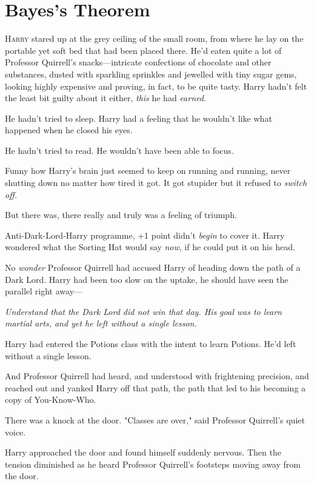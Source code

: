 \chapter{Bayes's Theorem}

\lettrine{H}{arry} stared up at the grey ceiling of the small room, from where he lay on the
portable yet soft bed that had been placed there. He'd eaten quite a lot of
Professor Quirrell's snacks---intricate confections of chocolate and other
substances, dusted with sparkling sprinkles and jewelled with tiny sugar gems,
looking highly expensive and proving, in fact, to be quite tasty. Harry hadn't
felt the least bit guilty about it either, \emph{this} he had \emph{earned}.

He hadn't tried to sleep. Harry had a feeling that he wouldn't like what
happened when he closed his eyes.

He hadn't tried to read. He wouldn't have been able to focus.

Funny how Harry's brain just seemed to keep on running and running, never
shutting down no matter how tired it got. It got stupider but it refused to
\emph{switch off.}

But there was, there really and truly was a feeling of triumph.

Anti-Dark-Lord-Harry programme, +1 point didn't \emph{begin} to cover it. Harry
wondered what the Sorting Hat would say \emph{now}, if he could put it on his
head.

No \emph{wonder} Professor Quirrell had accused Harry of heading down the path
of a Dark Lord. Harry had been too slow on the uptake, he should have seen the
parallel right away---

\emph{Understand that the Dark Lord did not win that day. His goal was to learn
martial arts, and yet he left without a single lesson.}

Harry had entered the Potions class with the intent to learn Potions. He'd left
without a single lesson.

And Professor Quirrell had heard, and understood with frightening precision,
and reached out and yanked Harry off that path, the path that led to his
becoming a copy of You-Know-Who.

There was a knock at the door. "Classes are over," said Professor Quirrell's
quiet voice.

Harry approached the door and found himself suddenly nervous. Then the tension
diminished as he heard Professor Quirrell's footsteps moving away from the door.

